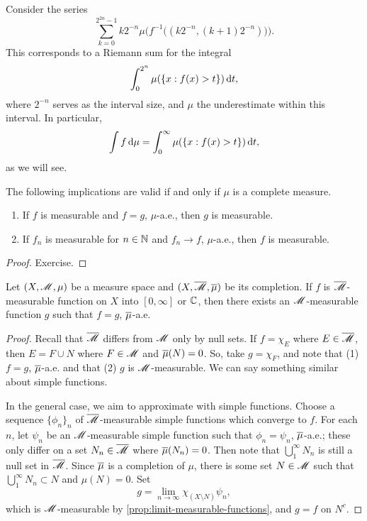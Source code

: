 \documentclass[12pt]{article} %
\begin{document}
\begin{remark}
    Consider the series
    \[\sum_{k=0}^{2^{2n} - 1} k2^{-n} \mu\Big( f^{-1}\Big((k2^{-n}, (k+1)2^{-n})\Big)\Big).\] This corresponds to a Riemann sum for the integral \[\int_0^{2^n} \mu(\{x : f(x) > t\}) \, \mathrm{d} t,\] where $2^{-n}$ serves as the interval size, and $\mu$ the underestimate within this interval. In particular, \[\int f \, \mathrm{d} \mu = \int_0^\infty \mu(\{x : f(x) > t\}) \, \mathrm{d} t,\] as we will see.
\end{remark}

\begin{proposition}\label{prop:equal-ae-iff-complete-measure}
    The following implications are valid if and only if $\mu$ is a complete measure. \begin{enumerate}
        \item If $f$ is measurable and $f = g$, $\mu$-a.e., then $g$ is measurable.
        \item If $f_n$ is measurable for $n \in \mathbb{N}$ and $f_n \to f$, $\mu$-a.e., then $f$ is measurable.
    \end{enumerate}
\end{proposition}

\begin{proof}
    Exercise.
\end{proof}

\begin{proposition}\label{prop:equal-ae-function-complete-measure}
    Let $(X, \mathscr{M}, \mu)$ be a measure space and $(X, \overline{\mathscr{M}}, \overline{\mu})$ be its completion. If $f$ is $\overline{\mathscr{M}}$-measurable function on $X$ into $[0,\infty]$ or $ \mathbb{C}$, then there exists an $\mathscr{M}$-measurable function $g$ such that $f = g$, $\overline{\mu}$-a.e.
\end{proposition}

\begin{proof}
    Recall that $\overline{\mathscr{M}}$ differs from $\mathscr{M}$ only by null sets. If $f = \chi_E$ where $E \in \overline{\mathscr{M}}$, then $E = F \cup N$ where $F \in \mathscr{M}$ and $\overline{\mu}(N) = 0$. So, take $g = \chi_F$, and note that (1) $f = g$, $\overline{\mu}$-a.e. and that (2) $g$ is $\mathscr{M}$-measurable. We can say something similar about simple functions.

    In the general case, we aim to approximate with simple functions. Choose a sequence $\{\phi_n\}_n$ of $\overline{\mathscr{M}}$-measurable simple functions which converge to $f$. For each $n$, let $\psi_n$ be an $\mathscr{M}$-measurable simple function such that $\phi_n = \psi_n$, $\overline{\mu}$-a.e.; these only differ on a set $N_n \in \overline{\mathscr{M}}$ where $\overline{\mu}(N_n) = 0$. Then note that $\bigcup_1^\infty N_n$ is still a null set in $\overline{\mathscr{M}}$. Since $\overline{\mu}$ is a completion of $\mu$, there is some set $N \in \mathscr{M}$ such that $\bigcup_1^\infty N_n \subset N$ and $\mu(N) = 0$. Set \[g = \lim_{n \to \infty} \chi_{(X \setminus N)} \psi_n,\] which is $\mathscr{M}$-measurable by \cref{prop:limit-measurable-functions}, and $g = f$ on $N^c$.
\end{proof}
\end{document}
